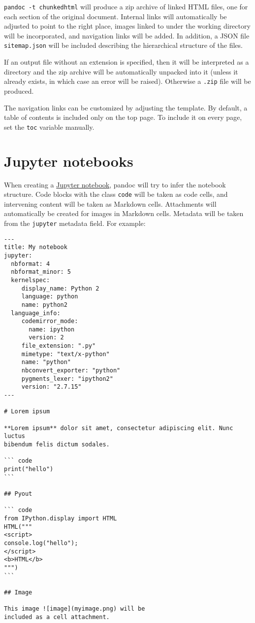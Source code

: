 \documentclass[
  a4paper,
]{article}
\begin{document}
\texttt{pandoc\ -t\ chunkedhtml} will produce a zip archive of linked
HTML files, one for each section of the original document. Internal
links will automatically be adjusted to point to the right place, images
linked to under the working directory will be incorporated, and
navigation links will be added. In addition, a JSON file
\texttt{sitemap.json} will be included describing the hierarchical
structure of the files.

If an output file without an extension is specified, then it will be
interpreted as a directory and the zip archive will be automatically
unpacked into it (unless it already exists, in which case an error will
be raised). Otherwise a \texttt{.zip} file will be produced.

The navigation links can be customized by adjusting the template. By
default, a table of contents is included only on the top page. To
include it on every page, set the \texttt{toc} variable manually.

\hypertarget{jupyter-notebooks}{%
\section{Jupyter notebooks}\label{jupyter-notebooks}}

When creating a
\href{https://nbformat.readthedocs.io/en/latest/}{Jupyter notebook},
pandoc will try to infer the notebook structure. Code blocks with the
class \texttt{code} will be taken as code cells, and intervening content
will be taken as Markdown cells. Attachments will automatically be
created for images in Markdown cells. Metadata will be taken from the
\texttt{jupyter} metadata field. For example:

\begin{verbatim}
---
title: My notebook
jupyter:
  nbformat: 4
  nbformat_minor: 5
  kernelspec:
     display_name: Python 2
     language: python
     name: python2
  language_info:
     codemirror_mode:
       name: ipython
       version: 2
     file_extension: ".py"
     mimetype: "text/x-python"
     name: "python"
     nbconvert_exporter: "python"
     pygments_lexer: "ipython2"
     version: "2.7.15"
---

# Lorem ipsum

**Lorem ipsum** dolor sit amet, consectetur adipiscing elit. Nunc luctus
bibendum felis dictum sodales.

``` code
print("hello")
```

## Pyout

``` code
from IPython.display import HTML
HTML("""
<script>
console.log("hello");
</script>
<b>HTML</b>
""")
```

## Image

This image ![image](myimage.png) will be
included as a cell attachment.
\end{verbatim}
\end{document}
